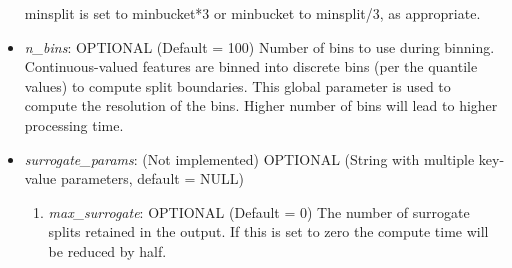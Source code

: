 \begin{itemize}
    minsplit is set to minbucket*3 or minbucket to minsplit/3, as appropriate.
    \item \emph{n\_bins}: OPTIONAL (Default = 100) Number of bins to use during binning.
    Continuous-valued features are binned into discrete bins (per the quantile values)
    to compute split boundaries. This global parameter is used to compute the resolution of the bins. Higher number of bins will lead to higher processing time.
    \item \emph{surrogate\_params}: (Not implemented) OPTIONAL (String with multiple key-value parameters, default = NULL)
        \begin{enumerate}
            \item \emph{max\_surrogate}: OPTIONAL (Default = 0)
                The number of surrogate splits retained in the output.
                If this is set to zero the compute time will be reduced by half.

\end{enumerate}
\end{itemize}
